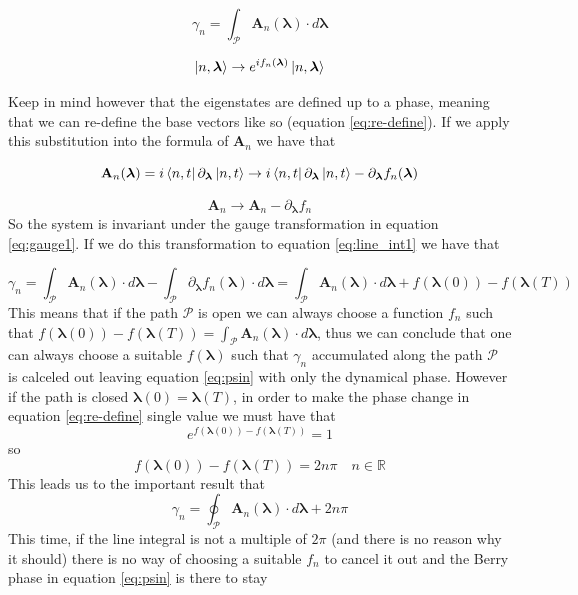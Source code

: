     \begin{equation}
        \label{eq:line_int1}
            \gamma_n=\int_\mathcal{P} \mathbf A_n(\boldsymbol \lambda) \cdot d\boldsymbol \lambda
    \end{equation}


    \begin{equation}
        \label{eq:re-define}
        \ket{n,\boldsymbol \lambda}\to e^{if_n(\boldsymbol \lambda)}\ket{n,\boldsymbol \lambda}
    \end{equation}

    Keep in mind however that the eigenstates are defined up to a phase, meaning that we can re-define the base vectors like so 
    (equation \ref{eq:re-define}). If we apply this substitution into the formula of $\mathbf A_n$ we have that

    \[
    \mathbf A_n(\boldsymbol \lambda) =i\bra{n,t} \partial_{\boldsymbol \lambda}\ket{n,t}\to i\bra{n,t} \partial_{\boldsymbol \lambda}\ket{n,t} - \partial_{\boldsymbol \lambda}f_n(\boldsymbol \lambda)
    \]

    \begin{equation}
        \label{eq:gauge1}
        \mathbf A_n \to \mathbf A_n - \partial_{\boldsymbol \lambda}f_n
    \end{equation}
        So the system is invariant under the gauge transformation in equation \ref{eq:gauge1}. If we do this transformation to equation \ref{eq:line_int1} we have that

    \[
        \gamma_n=\int_\mathcal{P} \mathbf A_n(\boldsymbol \lambda) \cdot d\boldsymbol \lambda - \int_\mathcal{P} \partial_{\boldsymbol \lambda}f_n(\boldsymbol \lambda) \cdot d\boldsymbol \lambda= \int_\mathcal{P} \mathbf A_n(\boldsymbol \lambda) \cdot d\boldsymbol \lambda + f(\boldsymbol \lambda(0))-f(\boldsymbol \lambda (T))
    \]
    This means that if the path $\mathcal{P}$ is open we can always choose a function $f_n$ such that 
    $f(\boldsymbol \lambda(0))-f(\boldsymbol \lambda(T))=\int_\mathcal{P} \mathbf A_n(\boldsymbol \lambda) \cdot d\boldsymbol \lambda$, 
    thus we can conclude that one can always choose a suitable $f(\boldsymbol \lambda)$ such that $\gamma_n$ accumulated along the path $\mathcal P$ is calceled out leaving equation 
    \ref{eq:psin} with only the dynamical phase. 
    However if the path is closed $\boldsymbol \lambda(0)=\boldsymbol \lambda(T)$, in order to make the phase change
    in equation \ref{eq:re-define} single value we must have that
    \[
    e^{f(\boldsymbol \lambda(0))-f(\boldsymbol \lambda(T))}=1
    \]
    so 
    \[
        f(\boldsymbol \lambda(0))-f(\boldsymbol \lambda(T))=2n\pi \quad n\in \mathbb{R}
    \]
    This leads us to the important result that
    \begin{equation}
        \label{eq:closed-berry}
        \gamma_n=\oint_{\mathcal P} \mathbf A_n(\boldsymbol \lambda)\cdot d\boldsymbol \lambda + 2n\pi
    \end{equation}
    This time, if the line integral is not a multiple of $2\pi$ (and there is no reason why it should) there is no way of choosing a suitable $f_n$ to
    cancel it out and the Berry phase in equation \ref{eq:psin} is there to stay



